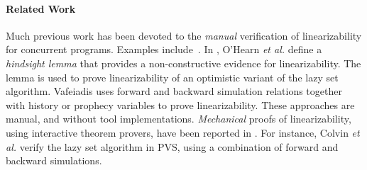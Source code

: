 \paragraph{Related Work}
Much previous work has been devoted to
the {\it manual} verification of linearizability for
concurrent programs. Examples
include~\cite{LF:pldi13,Aaron:locigcal:linearizability}.
%
In \cite{OHearnlist}, O'Hearn {\it et al.}  define a
{\it hindsight lemma} that
provides a non-constructive evidence for linearizability. 
%
The lemma is used to prove linearizability of an optimistic variant of 
the lazy set algorithm.
Vafeiadis \cite{Vafeiadis:Thesis}
uses forward and backward simulation relations together
with history or prophecy variables to prove linearizability.
%
These approaches are manual, and without
tool implementations.
{\it Mechanical} proofs of linearizability, using interactive theorem
provers, have been reported in 
\cite{Colvin:Lazy-List,Derrick:fm14,SWD:cav12,SDW:tcl14}.
%
For instance, Colvin {\it et al.} \cite{Colvin:Lazy-List}
verify the lazy set algorithm in  PVS,
using a combination of forward and backward simulations.

